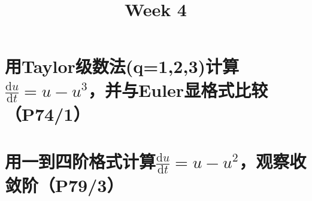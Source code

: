 \documentclass{homework}
\title{Week 4}
\date{}
\begin{document}
\maketitle
\section{用Taylor级数法(q=1,2,3)计算$\frac{\mathrm{d}u}{\mathrm{d}t}=u-u^3$，并与Euler显格式比较（P74/1）}

\section{用一到四阶格式计算$\frac{\mathrm{d}u}{\mathrm{d}t}=u-u^2$，观察收敛阶（P79/3）}
\end{document}
